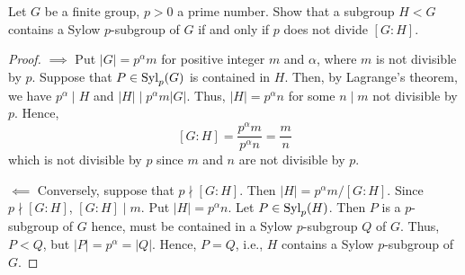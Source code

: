 \begin{problem}
Let $G$ be a finite group, $p>0$ a prime number. Show that a
subgroup $H<G$ contains a Sylow $p$-subgroup of $G$ if and only
if $p$ does not divide $[G:H]$.
\end{problem}
\begin{proof}
$\implies$ Put $|G|=p^\alpha m$ for positive integer $m$ and $\alpha$,
where $m$ is not divisible by $p$. Suppose that $P\in\operatorname{Syl}_p(G)$ is
contained in $H$. Then, by Lagrange's theorem, we have $p^\alpha\mid H$ and
$|H|\mid p^\alpha m|G|$. Thus, $|H|=p^\alpha n$ for some $n\mid m$ not
divisible by $p$. Hence,
\[
[G:H]=\frac{p^\alpha m}{p^\alpha n}=\frac{m}{n}
\]
which is not divisible by $p$ since $m$ and $n$ are not divisible by $p$.

$\impliedby$ Conversely, suppose that $p\nmid [G:H]$. Then $|H|=p^\alpha
m/[G:H]$. Since $p\nmid [G:H]$, $[G:H]\mid m$. Put $|H|=p^\alpha n$. Let
$P\in\operatorname{Syl}_p(H)$. Then $P$ is a $p$-subgroup of $G$ hence, must be contained
in a Sylow $p$-subgroup $Q$ of $G$. Thus, $P<Q$, but
$|P|=p^\alpha=|Q|$. Hence, $P=Q$, i.e., $H$ contains a Sylow $p$-subgroup
of $G$.
\end{proof}

